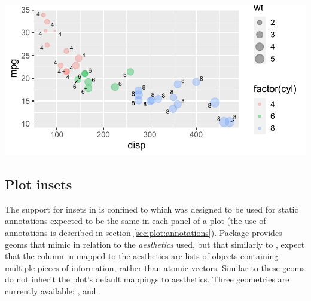 \documentclass[krantz2]{krantz}\usepackage{knitr}
\begin{document}
\begin{knitrout}\footnotesize
{}\color{fgcolor}\begin{kframe}
\begin{alltt}
\hlstd{(} 
       \hlstd{(}     \hlstd{=}      \hlopt{+}
  \hlstd{()} \hlopt{+}
  \hlstd{(} \hlstd{=} \hlopt{/}\hlstd{)} \hlopt{+}
  \hlstd{(} \hlstd{=} \hlstd{,}  \hlstd{=} \hlstd{,}
                   \hlstd{=} \hlstd{,}  \hlstd{=} \hlstd{)}
\end{alltt}
\end{kframe}

{\centering \includegraphics[width=.7\textwidth]{figure/pos-repel-plot-01-1} 

}


\end{knitrout}

\subsection{Plot insets}\label{sec:plot:insets}

The support for insets in  is confined to  which was designed to be used for static annotations expected to be the same in each panel of a plot (the use of annotations is described in section \ref{sec:plot:annotations}). Package  provides geoms that mimic  in relation to the \emph{aesthetics} used, but that similarly to , expect that the column in  mapped to the  aesthetics are lists of objects containing multiple pieces of information, rather than atomic vectors. Similar to  these geoms do not inherit the plot's default mappings to aesthetics. Three geometries are currently available: ,  and .
\end{document}
